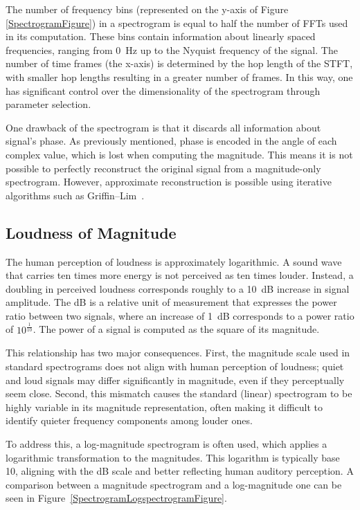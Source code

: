 The number of frequency bins (represented on the y-axis of Figure \ref{SpectrogramFigure}) in a spectrogram is equal to half the number of \glspl{FFT} used in its computation. These bins contain information about linearly spaced frequencies, ranging from 0~Hz up to the Nyquist frequency of the signal. The number of time frames (the x-axis) is determined by the hop length of the \gls{STFT}, with smaller hop lengths resulting in a greater number of frames. In this way, one has significant control over the dimensionality of the spectrogram through parameter selection. 

One drawback of the spectrogram is that it discards all information about signal's phase. As previously mentioned, phase is encoded in the angle of each complex value, which is lost when computing the magnitude. This means it is not possible to perfectly reconstruct the original signal from a magnitude-only spectrogram. However, approximate reconstruction is possible using iterative algorithms such as Griffin–Lim~\cite{1164317}.

\subsection{Loudness of Magnitude}

The human perception of loudness is approximately logarithmic. A sound wave that carries ten times more energy is not perceived as ten times louder. Instead, a doubling in perceived loudness corresponds roughly to a 10~\gls{dB} increase in signal amplitude. The \acrlong{dB} is a relative unit of measurement that expresses the power ratio between two signals, where an increase of 1~\gls{dB} corresponds to a power ratio of $10^\frac{1}{10}$. The power of a signal is computed as the square of its magnitude. 

This relationship has two major consequences. First, the magnitude scale used in standard spectrograms does not align with human perception of loudness; quiet and loud signals may differ significantly in magnitude, even if they perceptually seem close. Second, this mismatch causes the standard (linear) spectrogram to be highly variable in its magnitude representation, often making it difficult to identify quieter frequency components among louder ones.

To address this, a log-magnitude spectrogram is often used, which applies a logarithmic transformation to the magnitudes. This logarithm is typically base 10, aligning with the \acrlong{dB} scale and better reflecting human auditory perception. A comparison between a magnitude spectrogram and a log-magnitude one can be seen in Figure~\ref{SpectrogramLogspectrogramFigure}.


